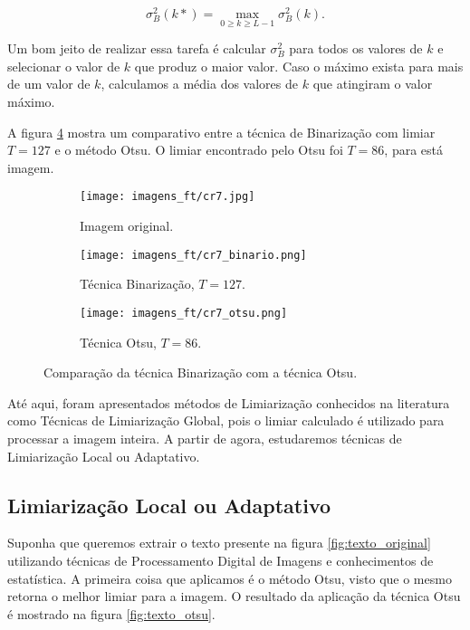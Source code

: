 \begin{equation}
	\sigma_B^2(k*) = \max_{0 \geq k \geq L - 1} \sigma_B^2(k).
\end{equation}

Um bom jeito de realizar essa tarefa é calcular $\sigma_B^2$ para todos os valores de $k$ e selecionar o valor de $k$ que produz o maior valor. Caso o máximo exista para mais de um valor de $k$, calculamos a média dos valores de $k$ que atingiram o valor máximo.

A figura \ref{fig:otsu} mostra um comparativo entre a técnica de Binarização com limiar $T = 127$ e o método Otsu. O limiar encontrado pelo Otsu foi $T = 86$, para está imagem.

\begin{figure}[h]
	\centering
	\begin{subfigure}[b]{0.45\textwidth}
		\centering
		\texttt{[image: imagens\_ft/cr7.jpg]}
		\caption{Imagem original.}
		\label{fig:otsu_original}
	\end{subfigure}
	\hfill
	\begin{subfigure}[b]{0.45\textwidth}
		\centering
		\texttt{[image: imagens\_ft/cr7\_binario.png]}
		\caption{Técnica Binarização, $T = 127$.}
		\label{fig:otsu_binario}
	\end{subfigure}
	\hfill
	\begin{subfigure}[b]{0.45\textwidth}
		\centering
		\texttt{[image: imagens\_ft/cr7\_otsu.png]}
		\caption{Técnica Otsu, $T = 86$.}
		\label{fig:otsu_aplicacao}
	\end{subfigure}
	\caption{Comparação da técnica Binarização com a técnica Otsu.}
	\label{fig:otsu}
\end{figure}

Até aqui, foram apresentados métodos de Limiarização conhecidos na literatura como Técnicas de Limiarização Global, pois o limiar calculado é utilizado para processar a imagem inteira. A partir de agora, estudaremos técnicas de Limiarização Local ou Adaptativo.

\subsection{Limiarização Local ou Adaptativo}

Suponha que queremos extrair o texto presente na figura \ref{fig:texto_original} utilizando técnicas de Processamento Digital de Imagens e conhecimentos de estatística. A primeira coisa que aplicamos é o método Otsu, visto que o mesmo retorna o melhor limiar para a imagem. O resultado da aplicação da técnica Otsu é mostrado na figura \ref{fig:texto_otsu}.

